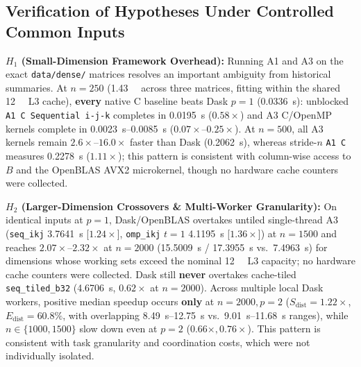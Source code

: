 \documentclass[11pt,a4paper]{article}
\begin{document}
\subsection{Verification of Hypotheses Under Controlled Common Inputs}
\noindent\textbf{$H_1$ (Small-Dimension Framework Overhead):} Running A1 and A3 on the exact \nolinkurl{data/dense/} matrices resolves an important ambiguity from historical summaries. At $n=250$ (\SI{1.43}{\mebi\byte} across three matrices, fitting within the shared \SI{12}{\mega\byte} L3 cache), \textbf{every} native C baseline beats Dask $p=1$ (\SI{0.0336}{\second}): unblocked \texttt{A1 C Sequential i-j-k} completes in \SI{0.0195}{\second} ($0.58\times$) and A3 C/OpenMP kernels complete in \SIrange{0.0023}{0.0085}{\second} ($0.07{\times}\text{--}0.25{\times}$). At $n=500$, all A3 kernels remain $2.6{\times}\text{--}16.0{\times}$ faster than Dask (\SI{0.2062}{\second}), whereas stride-$n$ \texttt{A1 C} measures \SI{0.2278}{\second} ($1.11\times$); this pattern is consistent with column-wise access to $B$ and the OpenBLAS AVX2 microkernel, though no hardware cache counters were collected.

\noindent\textbf{$H_2$ (Larger-Dimension Crossovers \& Multi-Worker Granularity):} On identical inputs at $p=1$, Dask/OpenBLAS overtakes untiled single-thread A3 (\texttt{seq\_ikj} \SI{3.7641}{\second} [$1.24\times$], \texttt{omp\_ikj} $t=1$ \SI{4.1195}{\second} [$1.36\times$]) at $n=1500$ and reaches $2.07{\times}\text{--}2.32{\times}$ at $n=2000$ (\SI{15.5009}{\second} / \SI{17.3955}{\second} vs.\ \SI{7.4963}{\second}) for dimensions whose working sets exceed the nominal \SI{12}{\mega\byte} L3 capacity; no hardware cache counters were collected. Dask still \textbf{never} overtakes cache-tiled \texttt{seq\_tiled\_b32} (\SI{4.6706}{\second}, $0.62\times$ at $n=2000$). Across multiple local Dask workers, positive median speedup occurs \textbf{only} at $n=2000, p=2$ ($S_{\text{dist}}=1.22\times$, $E_{\text{dist}}=60.8\%$, with overlapping \SIrange{8.49}{12.75}{\second} vs.\ \SIrange{9.01}{11.68}{\second} ranges), while $n \in \{1000, 1500\}$ slow down even at $p=2$ ($0.66\times, 0.76\times$). This pattern is consistent with task granularity and coordination costs, which were not individually isolated.
\end{document}
